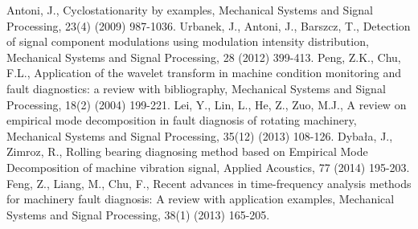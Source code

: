 \documentclass[3p,times]{elsarticle}
\begin{document}
\begin{thebibliography}{00}
 Antoni, J., Cyclostationarity by examples, Mechanical Systems and Signal Processing, 23(4) (2009) 987-1036.
 Urbanek, J., Antoni, J., Barszcz, T., Detection of signal component modulations using modulation intensity distribution, Mechanical Systems and Signal Processing, 28 (2012) 399-413.
 Peng, Z.K., Chu, F.L., Application of the wavelet transform in machine condition monitoring and fault diagnostics: a review with bibliography, Mechanical Systems and Signal Processing, 18(2) (2004) 199-221.
 Lei, Y., Lin, L., He, Z., Zuo, M.J., A review on empirical mode decomposition in fault diagnosis of rotating machinery, Mechanical Systems and Signal Processing, 35(12) (2013) 108-126.
 Dyba{\l}a, J., Zimroz, R., Rolling bearing diagnosing method based on Empirical Mode Decomposition of machine vibration signal, Applied Acoustics, 77 (2014) 195-203.
 Feng, Z., Liang, M., Chu, F., Recent advances in time-frequency analysis methods for machinery fault diagnosis: A review with application examples, Mechanical Systems and Signal Processing, 38(1) (2013) 165-205.


\end{thebibliography}
\end{document}
